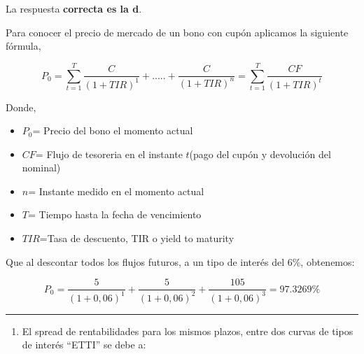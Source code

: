 \documentclass[
  letterpaper,
  DIV=11,
  numbers=noendperiod]{scrreprt}
\providecommand{\tightlist}{%
  \setlength{\itemsep}{0pt}\setlength{\parskip}{0pt}}\usepackage{longtable,booktabs,array}
\begin{document}
\begin{tcolorbox}[enhanced jigsaw, left=2mm, opacityback=0, colback=white, breakable, arc=.35mm, bottomrule=.15mm, rightrule=.15mm, toprule=.15mm, leftrule=.75mm, colframe=quarto-callout-tip-color-frame]
\begin{minipage}[t]{5.5mm}
\textcolor{quarto-callout-tip-color}{\faLightbulb}
\end{minipage}%
\begin{minipage}[t]{\textwidth - 5.5mm}

La respuesta \textbf{correcta es la d}.

Para conocer el precio de mercado de un bono con cupón aplicamos la
siguiente fórmula,

\[P_{ 0 }=\sum _{ t=1 }^{ T }{ \frac { C }{ { (1+TIR) }^{ 1 } }  } +.....+\frac { C }{ { (1+TIR) }^{ n } } =\sum _{ t=1 }^{ T }{ \frac { CF }{ { (1+TIR) }^{ t } }  } \]

Donde,

\begin{itemize}
\item
  \(P_0\)= Precio del bono el momento actual
\item
  \(CF\)= Flujo de tesoreria en el instante \(t\)(pago del cupón y
  devolución del nominal)
\item
  \(n\)= Instante medido en el momento actual
\item
  \(T\)= Tiempo hasta la fecha de vencimiento
\item
  \(TIR\)=Tasa de descuento, TIR o yield to maturity
\end{itemize}

Que al descontar todos los flujos futuros, a un tipo de interés del 6\%,
obtenemos:

\[P_0= \frac{ 5}{ (1+ 0,06)^{1}}+\frac{5}{ (1+ 0,06)^{2}}+\frac{105}{ (1+ 0,06)^{3}}=97.3269\% \]

\end{minipage}%
\end{tcolorbox}

\begin{center}\rule{0.5\linewidth}{0.5pt}\end{center}

\begin{enumerate}
\def\labelenumi{\arabic{enumi}.}
\setcounter{enumi}{104}
\tightlist
\item
  El spread de rentabilidades para los mismos plazos, entre dos curvas
  de tipos de interés ``ETTI'' se debe a:
\end{enumerate}
\end{document}
